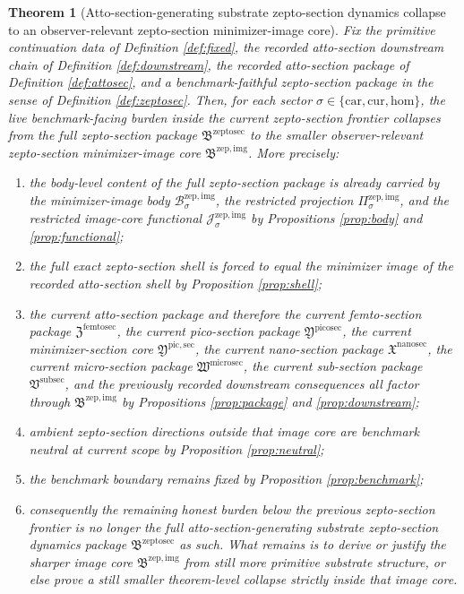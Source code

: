 \documentclass[11pt]{article}
\newcommand{\Car}{\mathrm{car}}
\newcommand{\Cur}{\mathrm{cur}}
\newcommand{\Hom}{\mathrm{hom}}
\newcommand{\SubSectionPackage}{\mathfrak V^{\mathrm{subsec}}}
\newcommand{\MicroSectionPackage}{\mathfrak W^{\mathrm{microsec}}}
\newcommand{\NanoSectionPackage}{\mathfrak X^{\mathrm{nanosec}}}
\newcommand{\PicoSectionPackage}{\mathfrak Y^{\mathrm{picosec}}}
\newcommand{\PicoMinSectionCore}{\mathfrak Y^{\mathrm{pic,sec}}}
\newcommand{\FemtoSectionPackage}{\mathfrak Z^{\mathrm{femtosec}}}
\newcommand{\ZeptoSectionPackage}{\mathfrak B^{\mathrm{zeptosec}}}
\newcommand{\ZeptoImageCore}{\mathfrak B^{\mathrm{zep,img}}}
\newcommand{\ZeptoImgBody}[1]{\mathcal B_{#1}^{\mathrm{zep,img}}}
\newcommand{\ZeptoImgProj}[1]{\Pi_{#1}^{\mathrm{zep,img}}}
\newcommand{\ZeptoImgFunctional}[1]{\mathscr J_{#1}^{\mathrm{zep,img}}}
\newtheorem{theorem}{Theorem}
\begin{document}
\begin{theorem}[Atto-section-generating substrate zepto-section dynamics collapse to an observer-relevant zepto-section minimizer-image core]
\label{thm:main}
Fix the primitive continuation data of Definition \ref{def:fixed}, the recorded atto-section downstream chain of Definition \ref{def:downstream}, the recorded atto-section package of Definition \ref{def:attosec}, and a benchmark-faithful zepto-section package in the sense of Definition \ref{def:zeptosec}. Then, for each sector \(\sigma\in\{\Car,\Cur,\Hom\}\), the live benchmark-facing burden inside the current zepto-section frontier collapses from the full zepto-section package \(\ZeptoSectionPackage\) to the smaller observer-relevant zepto-section minimizer-image core \(\ZeptoImageCore\). More precisely:
\begin{enumerate}
    \item the body-level content of the full zepto-section package is already carried by the minimizer-image body \(\ZeptoImgBody{\sigma}\), the restricted projection \(\ZeptoImgProj{\sigma}\), and the restricted image-core functional \(\ZeptoImgFunctional{\sigma}\) by Propositions \ref{prop:body} and \ref{prop:functional};
    \item the full exact zepto-section shell is forced to equal the minimizer image of the recorded atto-section shell by Proposition \ref{prop:shell};
    \item the current atto-section package and therefore the current femto-section package \(\FemtoSectionPackage\), the current pico-section package \(\PicoSectionPackage\), the current minimizer-section core \(\PicoMinSectionCore\), the current nano-section package \(\NanoSectionPackage\), the current micro-section package \(\MicroSectionPackage\), the current sub-section package \(\SubSectionPackage\), and the previously recorded downstream consequences all factor through \(\ZeptoImageCore\) by Propositions \ref{prop:package} and \ref{prop:downstream};
    \item ambient zepto-section directions outside that image core are benchmark neutral at current scope by Proposition \ref{prop:neutral};
    \item the benchmark boundary remains fixed by Proposition \ref{prop:benchmark};
    \item consequently the remaining honest burden below the previous zepto-section frontier is no longer the full atto-section-generating substrate zepto-section dynamics package \(\ZeptoSectionPackage\) as such. What remains is to derive or justify the sharper image core \(\ZeptoImageCore\) from still more primitive substrate structure, or else prove a still smaller theorem-level collapse strictly inside that image core.
\end{enumerate}
\end{theorem}
\end{document}
